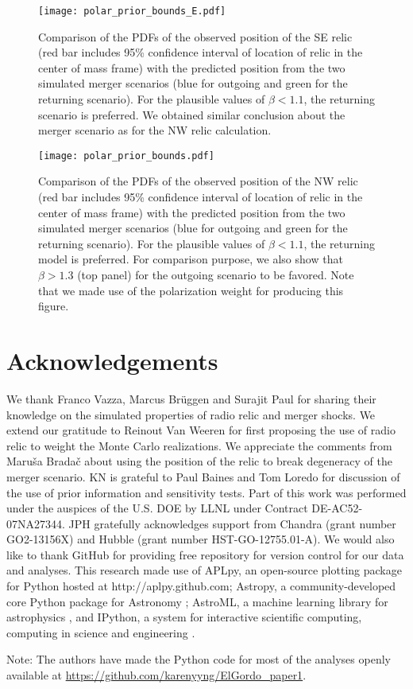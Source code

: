 \begin{figure}
	\begin{center}
	\texttt{[image: polar\_prior\_bounds\_E.pdf]}
		\caption{Comparison of the PDFs of the observed position of the SE relic (red bar
			includes 95\% confidence interval of location of relic in the center of
			mass frame) with the predicted position from the two simulated merger scenarios (blue for outgoing and green for the returning scenario). 
		For the plausible values of $\beta < 1.1$, the returning scenario is preferred. 
		We obtained similar conclusion about the merger scenario as for the NW
		relic calculation.
		\label{fig:positionprior_SE}}
\end{center}
\end{figure}

\begin{figure}
	\begin{center}
	\texttt{[image: polar\_prior\_bounds.pdf]}
	\caption{Comparison of the PDFs of the observed position of the NW relic (red bar
		includes 95\% confidence interval of location of relic in the center of
		mass frame) with the	predicted position from the two simulated merger scenarios (blue for outgoing and green for the returning scenario). 
	For the plausible values of $\beta  < 1.1$, the returning model is
	preferred. For comparison purpose, we also show that $\beta > 1.3$ (top
	panel) for the outgoing scenario to be favored.  
	Note that we made use of the polarization weight for producing this figure. 
	\label{fig:positionprior}}
\end{center}
\end{figure}
\clearpage
\section{Acknowledgements}
We thank Franco Vazza, Marcus Br\"{u}ggen and Surajit Paul for sharing
their knowledge on the simulated properties of radio relic and merger
shocks. We extend our gratitude to Reinout Van Weeren for first proposing the use of
radio relic to weight the Monte Carlo realizations. We appreciate the
comments from Maru\v{s}a Brada\v{c} about using the position of the relic to
break degeneracy of the merger scenario. KN is grateful to Paul Baines and
Tom Loredo for discussion of the use of prior information and sensitivity tests. 
Part of this work was performed under the auspices of the U.S. DOE by LLNL
under Contract DE-AC52-07NA27344. 
JPH gratefully acknowledges support from Chandra (grant number GO2-13156X)
and Hubble (grant number HST-GO-12755.01-A).
We would also like to thank 
GitHub for providing free repository for version control for our data and
analyses. This research made use of APLpy, an open-source plotting package for Python
hosted at http://aplpy.github.com; Astropy, a community-developed core
Python package for Astronomy \citep{astropy}; AstroML, a
machine learning library for astrophysics \citep{VanderPlas2012}, and IPython, a system for
interactive scientific computing, computing in science and engineering
\citep{Perez2007}.\par
Note: The authors have made the Python code for most of the analyses openly
available at
\href{https://github.com/karenyyng/ElGordo\_paper1}{https://github.com/karenyyng/ElGordo\_paper1}. 
